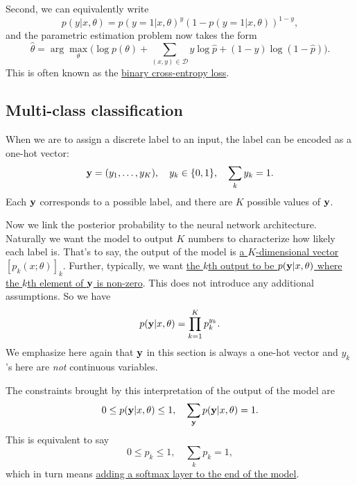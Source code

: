 \documentclass[hyperref, a4paper, 12pt]{report}
\newcommand*{\argmax}{\arg\max}
\begin{document}
Second, we can equivalently write 
\begin{equation}
    p(y| x, \theta) = p(y = 1 | x, \theta)^y (1 - p(y = 1 | x, \theta))^{1 - y},
\end{equation}
and the parametric estimation problem now takes the form 
\begin{equation}
    \hat{\theta} = \argmax_\theta \big( \log p(\theta) + \sum_{(x, y) \in \mathcal{D}} y \log \hat{p}  + (1 - y) \log (1 - \hat{p}) \big).
\end{equation}
This is often known as the \uline{binary cross-entropy loss}.


\subsection{Multi-class classification}

When we are to assign a discrete label to an input,
the label can be encoded as a one-hot vector:
\begin{equation}
    \vb{y} = (y_1, \dots, y_K), \quad y_k \in \{0, 1\}, \quad \sum_k y_k = 1.
\end{equation}
Each $\vb{y}$ corresponds to a possible label,
and there are $K$ possible values of $\vb{y}$.

Now we link the posterior probability to the neural network architecture.
Naturally we want the model to output $K$ numbers to characterize how likely each label is.
That's to say, the output of the model is \uline{a $K$-dimensional vector $[p_k(x; \theta)]_k$}.
Further, typically, we want \uline{the $k$th output to be $p(\vb{y} | x, \theta)$ where 
the $k$th element of $\vb{y}$ is non-zero}.
This does not introduce any additional assumptions.
So we have 
\begin{equation}
    p(\vb{y} | x, \theta) = \prod_{k=1}^K p_k^{y_k}.
\end{equation}
We emphasize here again that $\vb{y}$ in this section is always a one-hot vector and $y_k$'s here are \emph{not} continuous variables.

The constraints brought by this interpretation of the output of the model are 
\begin{equation}
    0 \leq p(\vb{y} | x, \theta) \leq 1, \quad \sum_{\vb{y}} p(\vb{y} | x, \theta) = 1.
\end{equation}
This is equivalent to say
\begin{equation}
    0 \leq p_k \leq 1, \quad \sum_k p_k = 1,
\end{equation}
which in turn means \uline{adding a softmax layer to the end of the model}.
\end{document}
